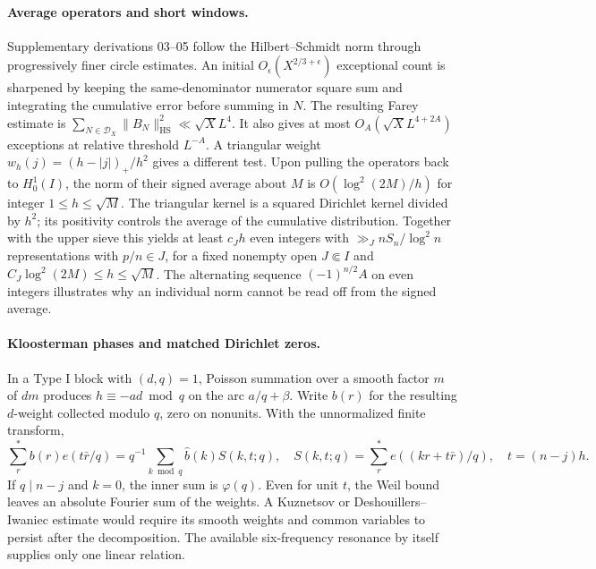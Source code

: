 \documentclass[11pt,a4paper]{article}
\newcommand{\HS}{{\mathrm{HS}}}\newcommand{\sep}{{\mathrm{sep}}}
\begin{document}
\paragraph{Average operators and short windows.}
Supplementary derivations 03--05 follow the Hilbert--Schmidt norm through progressively finer circle estimates. An initial \(O_\epsilon(X^{2/3+\epsilon})\) exceptional count is sharpened by keeping the same-denominator numerator square sum and integrating the cumulative error before summing in \(N\). The resulting Farey estimate is \(\sum_{N\in\mathcal D_X}\|B_N\|_{\HS}^2\ll\sqrt X L^4\). It also gives at most \(O_A(\sqrt X L^{4+2A})\) exceptions at relative threshold \(L^{-A}\). A triangular weight \(w_h(j)=(h-|j|)_+/h^2\) gives a different test. Upon pulling the operators back to \(H_0^1(I)\), the norm of their signed average about \(M\) is \(O(\log^2(2M)/h)\) for integer \(1\le h\le\sqrt M\). The triangular kernel is a squared Dirichlet kernel divided by \(h^2\); its positivity controls the average of the cumulative distribution. Together with the upper sieve this yields at least \(c_Jh\) even integers with \(\gg_J n S_n/\log^2n\) representations with \(p/n\in J\), for a fixed nonempty open \(J\Subset I\) and \(C_J\log^2(2M)\le h\le\sqrt M\). The alternating sequence \((-1)^{n/2}A\) on even integers illustrates why an individual norm cannot be read off from the signed average.

\paragraph{Kloosterman phases and matched Dirichlet zeros.}
In a Type I block with \((d,q)=1\), Poisson summation over a smooth factor \(m\) of \(dm\) produces \(h\equiv-ad\bmod q\) on the arc \(a/q+\beta\). Write \(b(r)\) for the resulting \(d\)-weight collected modulo \(q\), zero on nonunits. With the unnormalized finite transform,
\[
 \sum_r^*b(r)e(t\bar r/q)=q^{-1}\sum_{k\bmod q}\widehat b(k) S(k,t;q),
 \quad S(k,t;q)=\sum_r^*e((kr+t\bar r)/q),\quad t=(n-j)h.
\]
If \(q\mid n-j\) and \(k=0\), the inner sum is \(\varphi(q)\). Even for unit \(t\), the Weil bound leaves an absolute Fourier sum of the weights. A Kuznetsov or Deshouillers--Iwaniec estimate \cite{DI} would require its smooth weights and common variables to persist after the decomposition. The available six-frequency resonance by itself supplies only one linear relation.
\end{document}

